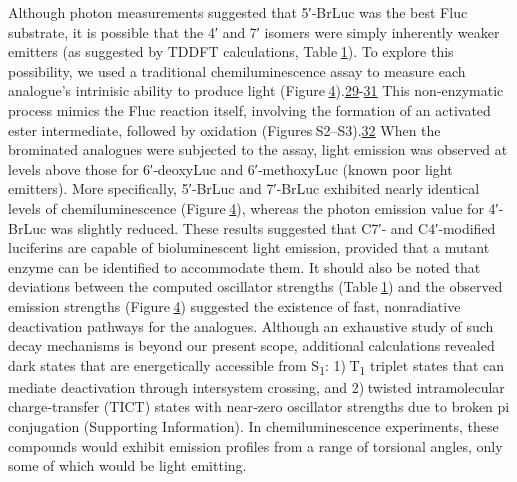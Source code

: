 Although photon measurements suggested that 5′‐BrLuc was the best Fluc
substrate, it is possible that the 4′ and 7′ isomers were simply
inherently weaker emitters (as suggested by TDDFT calculations,
Table \protect\hyperlink{cbic201600564-tbl-0001}{1}). To explore this
possibility, we used a traditional chemiluminescence assay to measure
each analogue's intrinisic ability to produce light
(Figure \protect\hyperlink{cbic201600564-fig-0003}{4}).{\protect\hyperlink{cbic201600564-bib-0029}{29}-\protect\hyperlink{cbic201600564-bib-0031}{31}}
This non‐enzymatic process mimics the Fluc reaction itself, involving
the formation of an activated ester intermediate, followed by oxidation
(Figures S2--S3).{\protect\hyperlink{cbic201600564-bib-0032}{32}} When
the brominated analogues were subjected to the assay, light emission was
observed at levels above those for 6′‐deoxyLuc and 6′‐methoxyLuc (known
poor light emitters). More specifically, 5′‐BrLuc and 7′‐BrLuc exhibited
nearly identical levels of chemiluminescence
(Figure \protect\hyperlink{cbic201600564-fig-0003}{4}), whereas the
photon emission value for 4′‐BrLuc was slightly reduced. These results
suggested that C7′‐ and C4′‐modified luciferins are capable of
bioluminescent light emission, provided that a mutant enzyme can be
identified to accommodate them. It should also be noted that deviations
between the computed oscillator strengths
(Table \protect\hyperlink{cbic201600564-tbl-0001}{1}) and the observed
emission strengths
(Figure \protect\hyperlink{cbic201600564-fig-0003}{4}) suggested the
existence of fast, nonradiative deactivation pathways for the analogues.
Although an exhaustive study of such decay mechanisms is beyond our
present scope, additional calculations revealed dark states that are
energetically accessible from S\textsubscript{1}: 1) T\textsubscript{1}
triplet states that can mediate deactivation through intersystem
crossing, and 2) twisted intramolecular charge‐transfer (TICT) states
with near‐zero oscillator strengths due to broken pi conjugation
(Supporting Information). In chemiluminescence experiments, these
compounds would exhibit emission profiles from a range of torsional
angles, only some of which would be light emitting.

